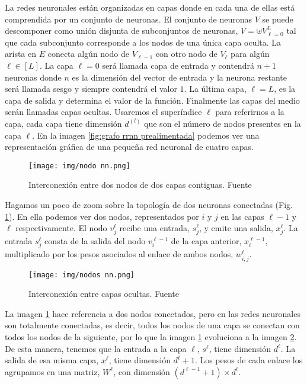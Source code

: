     La redes neuronales están organizadas en capas donde en cada una de ellas está comprendida por un conjunto de neuronas. El conjunto de neuronas $V$ se puede descomponer como unión disjunta de subconjuntos de neuronas, $V = \uplus V_{\ell=0}^L$ tal que cada subconjunto corresponde a los nodos de una única capa oculta. La arista en $E$ conecta algún nodo de $V_{\ell-1}$ con otro nodo de $V_{\ell}$ para algún $\ell \in [L]$. La capa $\ell = 0$ será llamada capa de entrada y contendrá $n+1$ neuronas donde $n$ es la dimensión del vector de entrada y la neurona restante será llamada sesgo y siempre contendrá el valor $1$. La última capa, $\ell = L$, es la capa de salida y determina el valor de la función. Finalmente las capas del medio serán llamadas capas ocultas. Usaremos el superíndice $\ell$ para referirnos a la capa, cada capa tiene dimensión $d^{(l)}$ que son el número de nodos presentes en la capa $\ell$. En la imagen \ref{fig:grafo rrnn prealimentada} podemos ver una representación gráfica de una pequeña red neuronal de cuatro capas. \\
    
   
    \begin{figure}[H]
        \centering
        \texttt{[image: img/nodo nn.png]}
        \caption{Interconexión entre dos nodos de dos capas contiguas. Fuente \cite{data}}
        \label{fig:nodo nn}
    \end{figure}
    
    
     Hagamos un poco de zoom sobre la topología de dos neuronas conectadas (Fig. \ref{fig:nodo nn}). En ella podemos ver dos nodos, representados por $i$ y $j$ en las capas $\ell -1$ y $\ell$ respectivamente. El nodo $v^{\ell}_j$ recibe una entrada, $s^{\ell}_j$, y emite una salida, $x^{\ell}_j$. La entrada $s^{\ell}_j$ consta de la salida del nodo $v^{\ell -1}_i$ de la capa anterior, $x^{\ell-1}_i$, multiplicado por los pesos asociados al enlace de ambos nodos, $w^{\ell}_{i,j}$.
    
    \begin{figure}[H]
        \centering
        \texttt{[image: img/nodos nn.png]}
        \caption{Interconexión entre capas ocultas. Fuente \cite{data}}
        \label{fig:nodos nn}
    \end{figure}
    
    
    La imagen \ref{fig:nodo nn} hace referencia a dos nodos conectados, pero en las redes neuronales son totalmente conectadas, es decir, todos los nodos de una capa se conectan con todos los nodos de la siguiente, por lo que la imagen \ref{fig:nodo nn} evoluciona a la imagen \ref{fig:nodos nn}. De esta manera, tenemos que la entrada a la capa $\ell$, $s^{\ell}$,  tiene dimensión $d^{\ell}$. La salida de esa misma capa, $x^{\ell}$, tiene dimensión $d^{\ell} + 1$. Los pesos de cada enlace los agrupamos en una matriz, $W^{\ell}$, con dimensión $(d^{\ell -1} + 1)\times d^{\ell}$. \\
    
